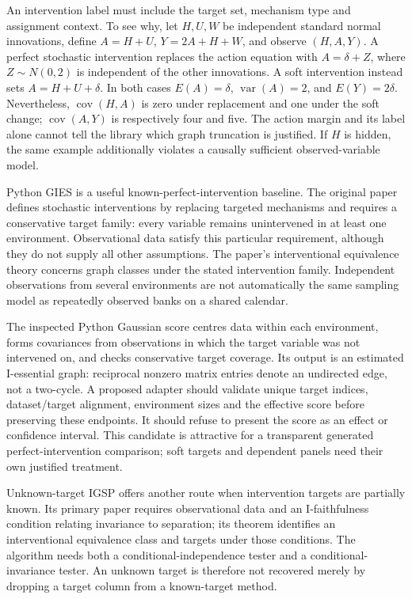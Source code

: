 An intervention label must include the target set, mechanism type and
assignment context. To see why, let $H,U,W$ be independent standard
normal innovations, define $A=H+U$, $Y=2A+H+W$, and observe $(H,A,Y)$.
A perfect stochastic
intervention replaces the action equation with $A=\delta+Z$, where
$Z\sim N(0,2)$ is independent of the other innovations. A soft intervention
instead sets $A=H+U+\delta$. In both cases $E(A)=\delta$,
$\operatorname{var}(A)=2$, and $E(Y)=2\delta$. Nevertheless,
$\operatorname{cov}(H,A)$ is zero under replacement and one under the soft
change; $\operatorname{cov}(A,Y)$ is respectively four and five. The action
margin and its label alone cannot tell the library which graph truncation
is justified. If $H$ is hidden, the same example additionally violates a
causally sufficient observed-variable model.\citep{exec14_pt_exact}

Python GIES is a useful known-perfect-intervention baseline. The original
paper defines stochastic interventions by replacing targeted mechanisms
and requires a conservative target family: every variable remains
unintervened in at least one environment. Observational data satisfy this
particular requirement, although they do not supply all other assumptions.
The paper's interventional equivalence theory concerns graph classes under
the stated intervention family. Independent observations from several
environments are not automatically the same sampling model as repeatedly
observed banks on a shared calendar.\citep{exec14_pt_paper_gies}

The inspected Python Gaussian score centres data within each environment,
forms covariances from observations in which the target variable was not
intervened on, and checks conservative target coverage. Its output is an
estimated I-essential graph: reciprocal nonzero matrix entries denote an
undirected edge, not a two-cycle. A proposed adapter should validate unique
target indices, dataset/target alignment, environment sizes and the
effective score before preserving these endpoints. It should refuse to
present the score as an effect or confidence interval. This candidate is
attractive for a transparent generated perfect-intervention comparison;
soft targets and dependent panels need their own justified treatment.
\citep{exec14_pt_gies,exec14_pt_contract}

Unknown-target IGSP offers another route when intervention targets are
partially known. Its primary paper requires observational data and an
I-faithfulness condition relating invariance to separation; its theorem
identifies an interventional equivalence class and targets under those
conditions. The algorithm needs both a conditional-independence tester and
a conditional-invariance tester. An unknown target is therefore not
recovered merely by dropping a target column from a known-target method.
\citep{exec14_pt_paper_utigsp}

